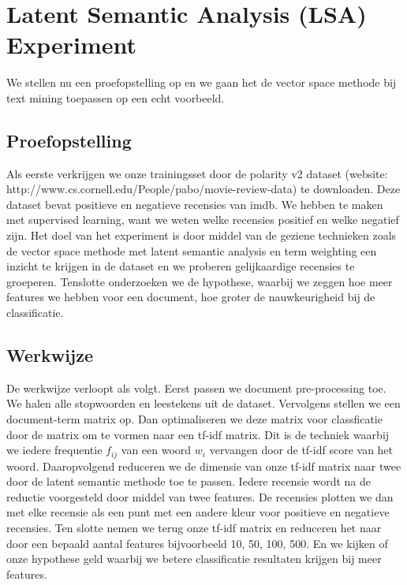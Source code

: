 \section{Latent Semantic Analysis (LSA) Experiment}\label{Latent Semantic Analysis Experiment (LSA) Experiment}

We stellen nu een proefopstelling op en we gaan het de vector space methode bij text mining toepassen op een echt voorbeeld.

\subsection{Proefopstelling}\label{Proefopstelling}
Als eerste verkrijgen we onze trainingsset door de polarity v2 dataset (website: http://www.cs.cornell.edu/People/pabo/movie-review-data) te downloaden. Deze dataset bevat positieve en negatieve recensies van imdb. We hebben te maken met supervised learning, want we weten welke recensies positief en welke negatief zijn. Het doel van het experiment is door middel van de geziene technieken zoals de vector space methode met latent semantic analysis en term weighting een inzicht te krijgen in de dataset en we proberen gelijkaardige recensies te groeperen. Tenslotte onderzoeken we de hypothese, waarbij we zeggen hoe meer features we hebben voor een document, hoe groter de nauwkeurigheid bij de classificatie.


\subsection{Werkwijze}\label{Werkwijze}

De werkwijze verloopt als volgt.
Eerst passen we document pre-processing toe. We halen alle stopwoorden en leestekens uit de dataset. Vervolgens stellen we een document-term matrix op. Dan optimaliseren we deze matrix voor classficatie door de matrix om te vormen naar een tf-idf matrix. Dit is de techniek waarbij we iedere frequentie $f_{ij}$ van een woord $w_{i}$ vervangen door de tf-idf score van het woord. Daaropvolgend reduceren we de dimensie van onze tf-idf matrix naar twee door de latent semantic methode toe te passen. Iedere recensie wordt na de reductie voorgesteld door middel van twee features. 
De recensies plotten we dan met elke recensie als een punt met een andere kleur voor positieve en negatieve recensies.
Ten slotte nemen we terug onze tf-idf matrix en reduceren het naar door een bepaald aantal features bijvoorbeeld 10, 50, 100, 500. En we kijken of onze hypothese geld waarbij we betere classificatie resultaten krijgen bij meer features.

